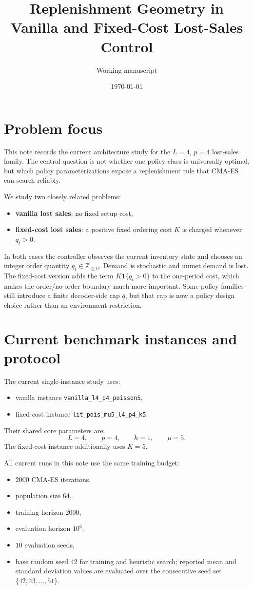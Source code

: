 \documentclass[11pt]{article}
\title{Replenishment Geometry in Vanilla and Fixed-Cost Lost-Sales Control}
\author{Working manuscript}
\date{\today}
\begin{document}
\maketitle

\section{Problem focus}

This note records the current architecture study for the $L=4$, $p=4$ lost-sales family. The
central question is not whether one policy class is universally optimal, but which policy
parameterizations expose a replenishment rule that CMA-ES can search reliably.

We study two closely related problems:
\begin{itemize}
    \item \textbf{vanilla lost sales}: no fixed setup cost,
    \item \textbf{fixed-cost lost sales}: a positive fixed ordering cost $K$ is charged whenever
    $q_t > 0$.
\end{itemize}

In both cases the controller observes the current inventory state and chooses an integer order
quantity $q_t \in \mathbb{Z}_{\ge 0}$. Demand is stochastic and unmet demand is lost. The
fixed-cost version adds the term $K\mathbf{1}\{q_t>0\}$ to the one-period cost, which makes the
order/no-order boundary much more important. Some policy families still introduce a finite
decoder-side cap $\bar q$, but that cap is now a policy design choice rather than an environment
restriction.

\section{Current benchmark instances and protocol}

The current single-instance study uses:
\begin{itemize}
    \item vanilla instance \texttt{vanilla\_l4\_p4\_poisson5},
    \item fixed-cost instance \texttt{lit\_pois\_mu5\_l4\_p4\_k5}.
\end{itemize}

Their shared core parameters are:
\[
L = 4, \qquad p = 4, \qquad h = 1, \qquad \mu = 5.
\]
The fixed-cost instance additionally uses $K=5$.

All current runs in this note use the same training budget:
\begin{itemize}
    \item $2000$ CMA-ES iterations,
    \item population size $64$,
    \item training horizon $2000$,
    \item evaluation horizon $10^6$,
    \item $10$ evaluation seeds,
    \item base random seed $42$ for training and heuristic search; reported mean and standard
    deviation values are evaluated over the consecutive seed set
    $\{42,43,\ldots,51\}$.
\end{itemize}
\end{document}
